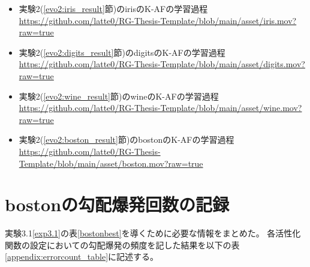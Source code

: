 \begin{itemize}
  \item 実験2(\ref{evo2:iris_result}節)のirisのK-AFの学習過程 \\ \href{https://github.com/latte0/RG-Thesis-Template/blob/main/asset/iris.mov?raw=true}{https://github.com/latte0/RG-Thesis-Template/blob/main/asset/iris.mov?raw=true}
  \item 実験2(\ref{evo2:digits_result}節)のdigitsのK-AFの学習過程 \\ \href{https://github.com/latte0/RG-Thesis-Template/blob/main/asset/digits.mov?raw=true}{https://github.com/latte0/RG-Thesis-Template/blob/main/asset/digits.mov?raw=true}
  \item 実験2(\ref{evo2:wine_result}節)のwineのK-AFの学習過程 \\ \href{https://github.com/latte0/RG-Thesis-Template/blob/main/asset/wine.mov?raw=true}{https://github.com/latte0/RG-Thesis-Template/blob/main/asset/wine.mov?raw=true}
  \item 実験2(\ref{evo2:boston_result}節)のbostonのK-AFの学習過程 \\ \href{https://github.com/latte0/RG-Thesis-Template/blob/main/asset/boston.mov?raw=true}{https://github.com/latte0/RG-Thesis-Template/blob/main/asset/boston.mov?raw=true}
\end{itemize}



\chapter{bostonの勾配爆発回数の記録}
\label{appendix:error}

実験3.1\ref{exp3.1}の表\ref{bostonbest}を導くために必要な情報をまとめた。
各活性化関数の設定においての勾配爆発の頻度を記した結果を以下の表\ref{appendix:errorcount_table}に記述する。

